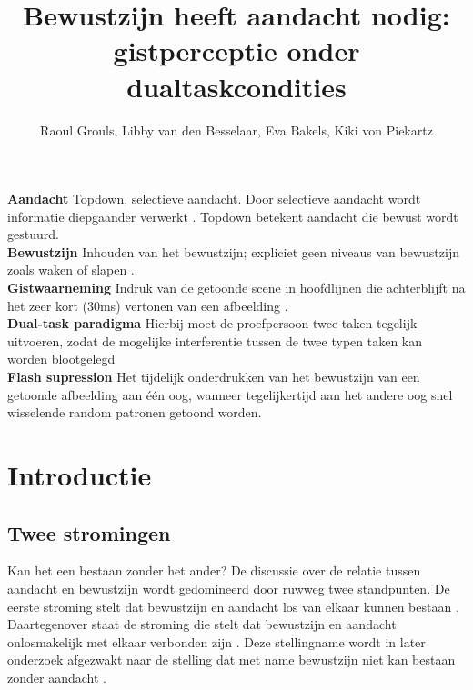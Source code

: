 \documentclass[a4paper,jou]{apa6}  %
\title{Bewustzijn heeft aandacht nodig: gistperceptie onder dualtaskcondities}
\author{Raoul Grouls, Libby van den Besselaar, Eva Bakels, Kiki von Piekartz}
\affiliation{Universiteit Utrecht}
\begin{document}
\maketitle
\begin{mdframed}
\small
\textbf{Aandacht} Topdown, selectieve aandacht. Door selectieve aandacht wordt informatie diepgaander verwerkt \cite{Cohen_Cavanagh_Chun_Nakayama_2012}. Topdown betekent aandacht die bewust wordt gestuurd.\\ 
\textbf{Bewustzijn} Inhouden van het bewustzijn; expliciet geen niveaus van bewustzijn zoals waken of slapen \cite{VanBoxtel_Tsuchiya_Koch_2010}.\\
\textbf{Gistwaarneming} Indruk van de getoonde scene in hoofdlijnen  die achterblijft na het zeer kort (30ms) vertonen van een afbeelding \cite{Mack_Clarke_2012}.\\
\textbf{Dual-task paradigma} Hierbij moet de proefpersoon twee taken tegelijk uitvoeren, zodat de mogelijke interferentie tussen de twee typen taken kan worden blootgelegd \cite{Reddy_Reddy_Koch_2006}\\
\textbf{Flash supression} Het tijdelijk onderdrukken van het bewustzijn van een getoonde afbeelding aan \'e\'en oog, wanneer tegelijkertijd aan het andere oog snel wisselende random patronen getoond worden. \cite{Sklar_Levy_Goldstein_Mandel_Maril_Hassin_2012}
\end{mdframed}

\section*{Introductie}
\subsection{Twee stromingen} 
Kan het een bestaan zonder het ander? De discussie over de relatie tussen aandacht en bewustzijn wordt gedomineerd door ruwweg twee standpunten. De eerste stroming stelt dat bewustzijn en aandacht los van elkaar kunnen bestaan \cite{Block_2011}. Daartegenover staat de stroming die stelt dat bewustzijn en aandacht onlosmakelijk met elkaar verbonden zijn \cite{Cohen_Dennett_2011}. Deze stellingname wordt in later onderzoek afgezwakt naar de stelling dat met name bewustzijn niet kan bestaan zonder aandacht \cite{Cohen_Cavanagh_Chun_Nakayama_2012}. 
\end{document}
